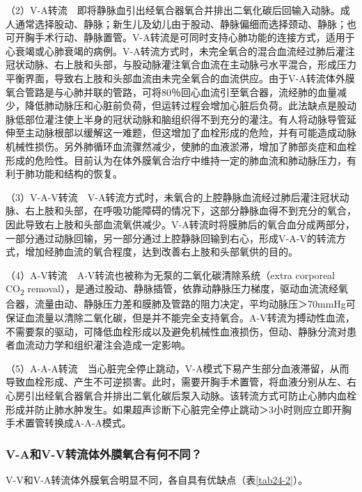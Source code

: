 （2）V-A转流　即将静脉血引出经氧合器氧合并排出二氧化碳后回输入动脉。成人通常选择股动、静脉；新生儿及幼儿由于股动、静脉偏细而选择颈动、静脉；也可开胸手术行动、静脉置管。V-A转流是可同时支持心肺功能的连接方式，适用于心衰竭或心肺衰竭的病例。V-A转流方式时，未完全氧合的混合血流经过肺后灌注冠状动脉、右上肢和头部，与股动脉灌注氧合血流在主动脉弓水平混合，形成压力平衡界面，导致右上肢和头部血流由未完全氧合的血流供应。由于V-A转流体外膜氧合管路是与心肺并联的管路，可将80％回心血流引至氧合器，流经肺的血量减少，降低肺动脉压和心脏前负荷，但运转过程会增加心脏后负荷。此法缺点是股动脉低部位灌注使上半身的冠状动脉和脑组织得不到充分的灌注。有人将动脉导管延伸至主动脉根部以缓解这一难题，但这增加了血栓形成的危险，并有可能造成动脉机械性损伤。另外肺循环血流骤然减少，使肺的血液淤滞，增加了肺部炎症和血栓形成的危险性。目前认为在体外膜氧合治疗中维持一定的肺血流和肺动脉压力，有利于肺功能和结构的恢复。

（3）V-A-V转流　V-A转流方式时，未氧合的上腔静脉血流经过肺后灌注冠状动脉、右上肢和头部，在呼吸功能障碍的情况下，这部分静脉血得不到充分的氧合，因此导致右上肢和头部血流氧供减少。V-A转流时将膜肺后的氧合血分成两部分，一部分通过动脉回输，另一部分通过上腔静脉回输到右心，形成V-A-V的转流方式，增加经肺血流的氧合程度，达到改善右上肢和头部氧供的目的。

（4）A-V转流　A-V转流也被称为无泵的二氧化碳清除系统（extra corporeal
CO\textsubscript{2}
removal），是通过股动、静脉插管，依靠动静脉压力梯度，驱动血流流经氧合器，流量由动、静脉压力差和膜肺及管路的阻力决定，平均动脉压＞70mmHg可保证血流量以清除二氧化碳，但是并不能完全支持氧合。A-V转流为搏动性血流，不需要泵的驱动，可降低血栓形成以及避免机械性血液损伤，但动、静脉分流对患者血流动力学和组织灌注会造成一定影响。

（5）A-A-A转流　当心脏完全停止跳动，V-A模式下易产生部分血液滞留，从而导致血栓形成、产生不可逆损害。此时，需要开胸手术置管，将血液分别从左、右心房引出经氧合器氧合并排出二氧化碳后泵入动脉。该转流方式可防止心肺内血栓形成并防止肺水肿发生。如果超声诊断下心脏完全停止跳动＞3小时则应立即开胸手术置管转换成A-A-A模式。

\subsubsection{V-A和V-V转流体外膜氧合有何不同？}

V-V和V-A转流体外膜氧合明显不同，各自具有优缺点（表\ref{tab24-2}）。

